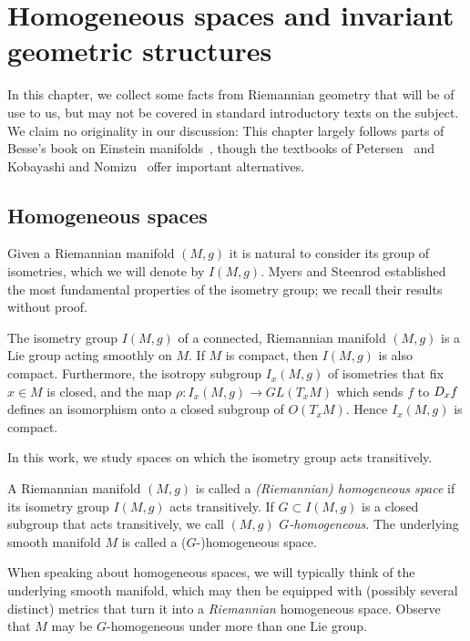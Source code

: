 \chapter{Homogeneous spaces and invariant geometric structures}
\label{chap:homogeneous}

In this chapter, we collect some facts from Riemannian geometry that will be of use to us, but may not be covered in standard introductory texts on the subject. We claim no originality in our discussion: This chapter largely follows parts of Besse's book on Einstein manifolds~\cite{Bes2008}, though the textbooks of Petersen~\cite{Pet2016} and Kobayashi and Nomizu~\cite{KN1963,KN1969} offer important alternatives.

\section{Homogeneous spaces}

Given a Riemannian manifold $(M,g)$ it is natural to consider its group of isometries, which we will denote by $I(M,g)$. Myers and Steenrod established the most fundamental properties of the isometry group; we recall their results without proof.

\begin{thm}
	The isometry group $I(M,g)$ of a connected, Riemannian manifold $(M,g)$ is a Lie group acting smoothly on $M$. If $M$ is compact, then $I(M,g)$ is also compact. Furthermore, the isotropy subgroup $I_x(M,g)$ of isometries that fix $x\in M$ is closed, and the map $\rho:I_x(M,g)\to GL(T_xM)$ which sends $f$ to $D_x f$ defines an isomorphism onto a closed subgroup of $O(T_xM)$. Hence $I_x(M,g)$ is compact. 
\end{thm}

In this work, we study spaces on which the isometry group acts transitively.

\begin{mydef}
	A Riemannian manifold $(M,g)$ is called a \emph{(Riemannian) homogeneous space} if its isometry group $I(M,g)$ acts transitively. If $G\subset I(M,g)$ is a closed subgroup that acts transitively, we call $(M,g)$ \emph{$G$-homogeneous}. The underlying smooth manifold $M$ is called a ($G$-)homogeneous space.
\end{mydef}

When speaking about homogeneous spaces, we will typically think of the underlying smooth manifold, which may then be equipped with (possibly several distinct) metrics that turn it into a \emph{Riemannian} homogeneous space. Observe that $M$ may be $G$-homogeneous under more than one Lie group.

